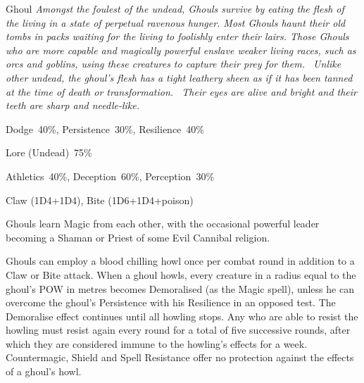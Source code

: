 \begin{samepage}
\begin{monsterbox}{Ghoul}
	\textit{Amongst the foulest of the undead, Ghouls survive by eating the flesh of the living in a state of perpetual ravenous hunger. Most Ghouls haunt their old tombs in packs waiting for the living to foolishly enter their lairs. Those Ghouls who are more capable and magically powerful enslave weaker living races, such as orcs and goblins, using these creatures to capture their prey for them.  Unlike other undead, the ghoul’s flesh has a tight leathery sheen as if it has been tanned at the time of death or transformation.  Their eyes are alive and bright and their teeth are sharp and needle-like.}\\
	\rpghline
	\basics[%
        hitpoints  = 12, 
	majorwound = 6,
	damagemodifier = +1D4,
	powerpoints = 11,
	movementrate = 15m,
	armor = None,
	plunderrating = 1
	]
	\rpghline%
	\stats[ %
		STR = 4D6   (14),
		CON = 3D6   (11),
		DEX = 3D6   (11),
		SIZ = 2D6+6 (13),
		INT = 3D6   (11),
		POW = 3D6   (11),
		CHA = 1D6   (4)
	]
	\rpghline
	\begin{rpg-monsteraction}[Resistances]
		Dodge~40\%, Persistence~30\%, Resilience~40\%
	\end{rpg-monsteraction}
	\begin{rpg-monsteraction}[Knowledge]
		Lore (Undead)~75\%
	\end{rpg-monsteraction}
	\begin{rpg-monsteraction}[Practical]
		Athletics~40\%, Deception~60\%, Perception~30\%
	\end{rpg-monsteraction}
	\begin{rpg-monsteraction}
		Claw (1D4+1D4), Bite (1D6+1D4+poison)
	\end{rpg-monsteraction}
	\begin{rpg-monsteraction}[Magic]
		Ghouls learn Magic from each other, with the occasional powerful leader becoming a Shaman or Priest of some Evil Cannibal religion.
	\end{rpg-monsteraction}
	\begin{rpg-monsteraction}
		Ghouls can employ a blood chilling howl once per combat round in addition to a Claw or Bite attack. When a ghoul howls, every creature in a radius equal to the ghoul’s POW in metres becomes Demoralised (as the Magic spell), unless he can overcome the ghoul’s Persistence with his Resilience in an opposed test. The Demoralise effect continues until all howling stops. Any who are able to resist the howling must resist again every round for a total of five successive rounds, after which they are considered immune to the howling’s effects for a week. Countermagic, Shield and Spell Resistance offer no protection against the effects of a ghoul’s howl. 

\end{rpg-monsteraction}
\end{monsterbox}
\end{samepage}
